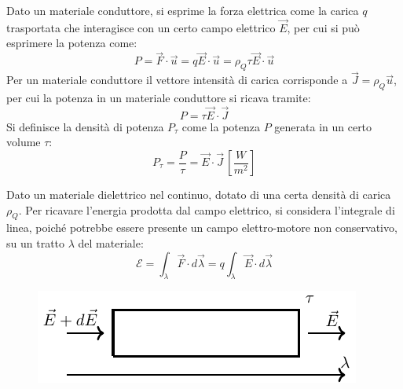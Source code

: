\documentclass{article}
\numberwithin{equation}{subsection}
\begin{document}
Dato un materiale conduttore, si esprime la forza elettrica come la carica $q$ trasportata che interagisce con un certo campo elettrico $\vec{E}$, per cui si può esprimere 
la potenza come:
\begin{equation*}
    P=\vec{F}\cdot\vec{u}=q\vec{E}\cdot\vec{u}=\rho_Q\tau\vec{E}\cdot\vec{u}
\end{equation*}
Per un materiale conduttore il vettore intensità di carica corrisponde a $\vec{J}=\rho_Q\vec{u}$, per cui la potenza in un materiale conduttore si ricava tramite:
\begin{equation*}
    P=\tau\vec{E}\cdot\vec{J}
\end{equation*}
Si definisce la densità di potenza $P_\tau$ come la potenza $P$ generata in un certo volume $\tau$: 
\begin{equation}
    P_{\tau}=\displaystyle\frac{P}{\tau}=\vec{E}\cdot\vec{J}\,\left[\frac{W}{m^2}\right]
\end{equation}


Dato un materiale dielettrico nel continuo, dotato di una certa densità di carica $\rho_Q$. Per ricavare l'energia prodotta dal campo elettrico, si considera l'integrale 
di linea, poiché potrebbe essere presente un campo elettro-motore non conservativo, su un tratto $\lambda$ del materiale:
\begin{equation*}
    \mathscr{E}=\displaystyle\int_{\lambda}\vec{F}\cdot d\vec{\lambda}=q\int_{\lambda}\vec{E}\cdot d\vec{\lambda}
\end{equation*}

\begin{figure}[H]%
    \centering
    \includegraphics{materiale-dielettrico.pdf}
    \label{fig:materiale-dielettrico}
\end{figure}
\end{document}
